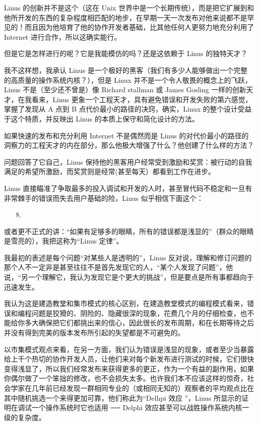Linus 的创新并不是这个（这在 Unix 世界中是一个长期传统），而是把它扩展到和他所开发的东西的复杂程度相匹配的地步，在早期一天一次发布对他来说都不是罕见的！而且因为他培育了他的协作开发者基础，比其他任何人更努力地充分利用了 Internet 进行合作，所以这确实能行。


但是它是怎样进行的呢？它是我能模仿的吗？还是这依赖于 Linus 的独特天才？


我不这样想，我承认 Linus 是一个极好的黑客（我们有多少人能够做出一个完整的高质量的操作系统内核？），但是 Linux 并不是一个令人敬畏的概念上的飞跃，Linus 不是（至少还不曾是）像 Richard stallman 或 James Gosling 一样的创新天才，在我看来，Linus 更象一个工程天才，具有避免错误和开发失败的第六感觉，掌握了发现从 A 点到 B 点代价最小的路径的决窍，确实，Linux 的整个设计受益于这个特质，并反映出 Linus 的本质上保守和简化设计的方法。


如果快速的发布和充分利用 Internet 不是偶然而是 Linus 的对代价最小的路径的洞察力的工程天才的内在部分，那么他极大增强了什么？他创建了什么样的方法？


问题回答了它自己，Linus 保持他的黑客用户经常受到激励和奖赏：被行动的自我满足的希望所激励，而奖赏则是经常(甚至每天）都看到工作在进步。


Linus 直接瞄准了争取最多的投入调试和开发的人时，甚至冒代码不稳定和一旦有非常棘手的错误而失去用户基础的险，Linus 似乎相信下面这个：

\begin{enumerate}
\item[8.] \\ 
\end{enumerate}

或者更不正式的讲：“如果有足够多的眼睛，所有的错误都是浅显的”（群众的眼睛是雪亮的），我把这称为“Linus 定律”。


我最初的表述是每个问题“对某些人是透明的”，Linus 反对说，理解和修订问题的那个人不一定非是甚至往往不是首先发现它的人，“某个人发现了问题”，他说，“另一个理解它，我认为发现它是个更大的挑战”，但是要点是所有事都趋向于迅速发生。


我认为这是建造教堂和集市模式的核心区别，在建造教堂模式的编程模式看来，错误和编程问题是狡猾的、阴险的、隐藏很深的现象，花费几个月的仔细检查，也不能给你多大确保把它们都挑出来的信心，因此很长的发布周期，和在长期等待之后并没有得到完美的版本发布所引起的失望都是不可避免的。


以市集模式观点来看，在另一方面，我们认为错误是浅显的现象，或者至少当暴露给上千个热切的协作开发人员，让他们来对每个新发布进行测试的时候，它们很快变得浅显了，所以我们经常发布来获得更多的更正，作为一个有益的副作用，如果你偶尔做了一个笨拙的修改，也不会损失太多。也许我们本不应该这样的惊奇，社会学家在几年前已经发现一群相同专业的（或相同无知的）观察者的平均观点比在其中随机挑选一个来得更加可靠，他们称此为“Delhpi 效应 ”，Linus 所显示的证明在调试一个操作系统时它也适用 ── Delphi 效应甚至可以战胜操作系统内核一级的复杂度。


